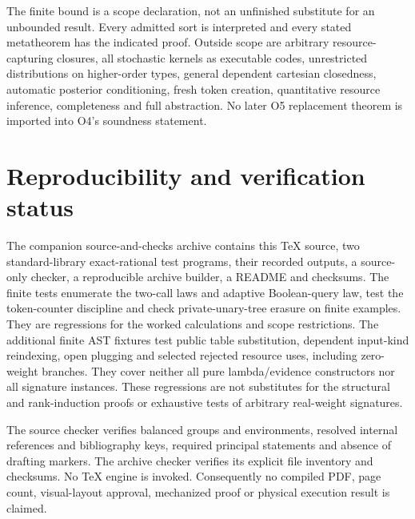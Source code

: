 \documentclass[11pt,a4paper]{article}
\theoremstyle{definition}
\begin{document}
The finite bound is a scope declaration, not an unfinished substitute for
an unbounded result. Every admitted sort is interpreted and every stated
metatheorem has the indicated proof. Outside scope are arbitrary
resource-capturing closures, all stochastic kernels as executable codes,
unrestricted distributions on higher-order types, general dependent
cartesian closedness, automatic posterior conditioning, fresh token
creation, quantitative resource inference, completeness and full
abstraction. No later O5 replacement theorem is imported into O4's
soundness statement.

\section{Reproducibility and verification status}\label{sec:checks}
The companion source-and-checks archive contains this TeX source,
two standard-library exact-rational test programs, their recorded outputs, a
source-only checker, a reproducible archive builder, a README and checksums.
The finite tests enumerate the two-call laws and adaptive Boolean-query
law, test the token-counter discipline and check private-unary-tree erasure
on finite examples. They are regressions for the worked calculations and
scope restrictions. The additional finite AST fixtures test public table
substitution, dependent input-kind reindexing, open plugging and selected
rejected resource uses, including zero-weight branches. They cover neither
all pure lambda/evidence constructors nor all signature instances. These
regressions are not substitutes for the structural and rank-induction
proofs or exhaustive tests of arbitrary real-weight signatures.

The source checker verifies balanced groups and environments, resolved
internal references and bibliography keys, required principal statements
and absence of drafting markers. The archive checker verifies its explicit
file inventory and checksums. No TeX engine is invoked. Consequently no
compiled PDF, page count, visual-layout approval, mechanized proof or
physical execution result is claimed.
\end{document}
